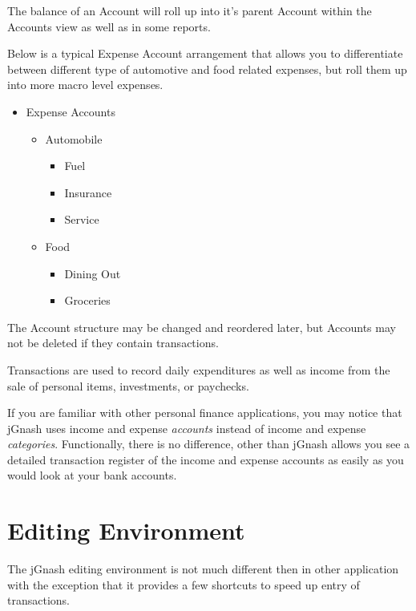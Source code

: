 \documentclass[letterpaper,12pt]{book}
\begin{document}
    The balance of an Account will roll up into it's parent Account within the Accounts view as well as in some reports.

    Below is a typical Expense Account arrangement that allows you to differentiate between different type of automotive
    and food related expenses, but roll them up into more macro level expenses.

    \begin{mdframed}[style=info]
        \begin{itemize}
            \item Expense Accounts
            \begin{itemize}
                \item Automobile
                \begin{itemize}
                    \item Fuel
                    \item Insurance
                    \item Service
                \end{itemize}
                \item Food
                \begin{itemize}
                    \item Dining Out
                    \item Groceries
                \end{itemize}
            \end{itemize}
        \end{itemize}
    \end{mdframed}

    The Account structure may be changed and reordered later, but Accounts may not be deleted if they contain transactions.

    Transactions are used to record daily expenditures as well as income from the sale of personal items, investments, or
    paychecks.

    If you are familiar with other personal finance applications, you may notice that jGnash uses income and expense
    \textit{accounts} instead of income and expense \textit{categories}.
    Functionally, there is no difference, other than jGnash allows you see a detailed transaction register of the
    income and expense accounts as easily as you would look at your bank accounts.

    \section{Editing Environment}\label{sec:editing-environment}
    The jGnash editing environment is not much different then in other application with the exception that it provides a
    few shortcuts to speed up entry of transactions.
\end{document}
